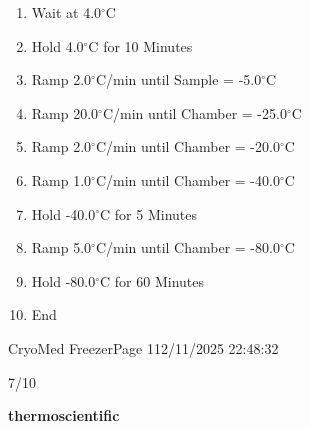 \documentclass[UTF8,10pt,a4paper,fontset=fandol]{ctexart}
\newcommand{\fieldvalue}[1]{#1}
\newcommand{\handwritten}[1]{#1}
\begin{document}
\begin{enumerate}
\item
\fieldvalue{Wait at 4.0$^\circ$C}

\item
\fieldvalue{Hold 4.0$^\circ$C for 10 Minutes}

\item
\fieldvalue{Ramp 2.0$^\circ$C/min until Sample = -5.0$^\circ$C}

\item
\fieldvalue{Ramp 20.0$^\circ$C/min until Chamber = -25.0$^\circ$C}

\item
\fieldvalue{Ramp 2.0$^\circ$C/min until Chamber = -20.0$^\circ$C}

\item
\fieldvalue{Ramp 1.0$^\circ$C/min until Chamber = -40.0$^\circ$C}

\item
\fieldvalue{Hold -40.0$^\circ$C for 5 Minutes}

\item
\fieldvalue{Ramp 5.0$^\circ$C/min until Chamber = -80.0$^\circ$C}

\item
\fieldvalue{Hold -80.0$^\circ$C for 60 Minutes}

\item
\fieldvalue{End}
\end{enumerate}

\noindent CryoMed Freezer\hfill Page 1\hfill 12/11/2025 22:48:32

\handwritten{7/10}

\newpage

\begin{flushright}
\textbf{thermo\textsf{scientific}}
\end{flushright}
\end{document}
